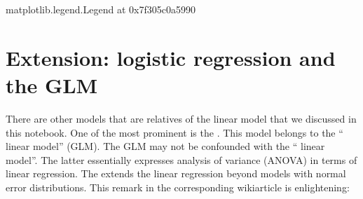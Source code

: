 \documentclass[letterpaper,10pt,english]{jupyterBook}
\begin{document}
\begin{sphinxVerbatim}[commandchars=\\\{\}]
  \PYG{p}{[} \PYG{p}{[}\PYG{p}{]} \PYG{p}{[} \PYG{p}{]}\PYGZbs{}
                                 \PYG{p}{]} \PYG{p}{[} \PYG{p}{]}   
   
 
  
\end{sphinxVerbatim}

\begin{sphinxVerbatim}[commandchars=\\\{\}]
\PYGZlt{}matplotlib.legend.Legend at 0x7f305c0a5990\PYGZgt{}
\end{sphinxVerbatim}

\noindent{}


\chapter{Extension: logistic regression and the GLM}
\label{\detokenize{Regression_Techniques:extension-logistic-regression-and-the-glm}}
\sphinxAtStartPar
There are other models that are relatives of the linear model that we discussed in this notebook. One of the most prominent is the . This model belongs to the “ linear model” (GLM). The GLM may not be confounded with the “ linear model”. The latter essentially expresses analysis of variance (ANOVA) in terms of linear regression.
The  extends the
linear regression beyond models with normal error distributions. This
remark in the corresponding wiki\sphinxhyphen{}article is enlightening:
\end{document}
